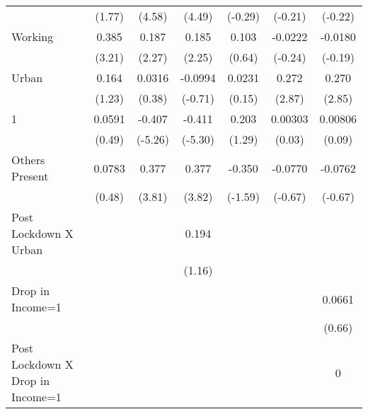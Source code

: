 \begin{table}[htbp]
\begin{tabular}{l*{6}{c}}
                    &      (1.77)         &      (4.58)         &      (4.49)         &     (-0.29)         &     (-0.21)         &     (-0.22)         \\
[1em]
Working             &       0.385\sym{**} &       0.187\sym{*}  &       0.185\sym{*}  &       0.103         &     -0.0222         &     -0.0180         \\
                    &      (3.21)         &      (2.27)         &      (2.25)         &      (0.64)         &     (-0.24)         &     (-0.19)         \\
[1em]
Urban               &       0.164         &      0.0316         &     -0.0994         &      0.0231         &       0.272\sym{**} &       0.270\sym{**} \\
                    &      (1.23)         &      (0.38)         &     (-0.71)         &      (0.15)         &      (2.87)         &      (2.85)         \\
[1em]
1                   &      0.0591         &      -0.407\sym{***}&      -0.411\sym{***}&       0.203         &     0.00303         &     0.00806         \\
                    &      (0.49)         &     (-5.26)         &     (-5.30)         &      (1.29)         &      (0.03)         &      (0.09)         \\
[1em]
Others Present      &      0.0783         &       0.377\sym{***}&       0.377\sym{***}&      -0.350         &     -0.0770         &     -0.0762         \\
                    &      (0.48)         &      (3.81)         &      (3.82)         &     (-1.59)         &     (-0.67)         &     (-0.67)         \\
[1em]
Post Lockdown X Urban&                     &                     &       0.194         &                     &                     &                     \\
                    &                     &                     &      (1.16)         &                     &                     &                     \\
[1em]
Drop in Income=1    &                     &                     &                     &                     &                     &      0.0661         \\
                    &                     &                     &                     &                     &                     &      (0.66)         \\
[1em]
Post Lockdown X Drop in Income=1&                     &                     &                     &                     &                     &           0         \\

\end{tabular}
\end{table}
